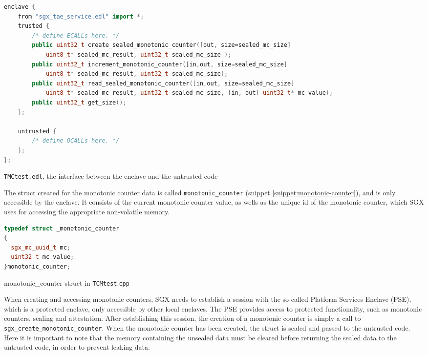 \documentclass[12pt]{article}
\begin{document}
	\vspace{-1cm}
	\begin{snippet}[!ht]
	\begin{lstlisting}[language=C++, numbers=none]
enclave {
	from "sgx_tae_service.edl" import *;
    trusted {
        /* define ECALLs here. */
        public uint32_t create_sealed_monotonic_counter([out, size=sealed_mc_size]
            uint8_t* sealed_mc_result, uint32_t sealed_mc_size );
		public uint32_t increment_monotonic_counter([in,out, size=sealed_mc_size]
            uint8_t* sealed_mc_result, uint32_t sealed_mc_size);
		public uint32_t read_sealed_monotonic_counter([in,out, size=sealed_mc_size]
            uint8_t* sealed_mc_result, uint32_t sealed_mc_size, [in, out] uint32_t* mc_value);
		public uint32_t get_size();
    };

    untrusted {
        /* define OCALLs here. */
    };
};
	\end{lstlisting}
	\caption{\texttt{TMCtest.edl}, the interface between the enclave and the untrusted code\label{snippet:tmctest.edl}}
	\end{snippet}

	The struct created for the monotonic counter data is called \texttt{monotonic\_counter} (snippet \ref{snippet:monotonic-counter}), and is only accessible by the enclave. It consists of the current monotonic counter value, as wells as the unique id of the monotonic counter, which SGX uses for accessing the appropriate non-volatile memory.

	\vspace{-1cm}
	\begin{snippet}[!ht]
		\begin{lstlisting}[language=C++, numbers=none]
typedef struct _monotonic_counter
{
  sgx_mc_uuid_t mc;
  uint32_t mc_value;
}monotonic_counter;
		\end{lstlisting}
		\caption{monotonic\_counter struct in \texttt{TCMtest$.$cpp} \label{snippet:monotonic-counter}}
	\end{snippet}

	When creating and accessing monotonic counters, SGX needs to establish a session with the so-called Platform Services Enclave (PSE), which is a protected enclave, only accessible by other local enclaves. 
	The PSE provides access to protected functionality, such as monotonic counters, sealing and attestation.
	After establishing this session, the creation of a monotonic counter is simply a call to \texttt{sgx\_create\_monotonic\_counter}.
	When the monotonic counter has been created, the struct is sealed and passed to the untrusted code. 
	Here it is important to note that the memory containing the unsealed data must be cleared before returning the sealed data to the untrusted code, in order to prevent leaking data.
\end{document}
